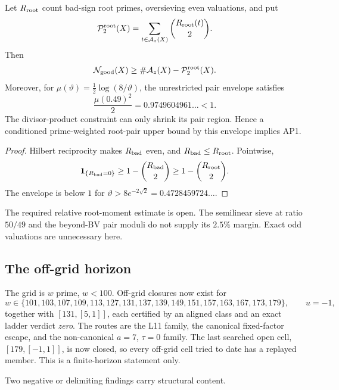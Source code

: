 \begin{proposition}
Let \(R_{\rm root}\) count bad-sign root primes, oversieving even
valuations, and put
\[
\mathcal P_2^{\rm root}(X)=
\sum_{t\in\mathcal A_z(X)}\binom{R_{\rm root}(t)}2.
\]
Then
\[
\mathcal N_{\rm good}(X)
\ge\#\mathcal A_z(X)-\mathcal P_2^{\rm root}(X).
\]
Moreover, for \(\mu(\vartheta)=\frac12\log(8/\vartheta)\), the
unrestricted pair envelope satisfies
\[
\frac{\mu(0.49)^2}{2}=0.9749604961\ldots<1.
\]
The divisor-product constraint can only shrink its pair region.  Hence
a conditioned prime-weighted root-pair upper bound by this envelope
implies AP1.
\end{proposition}

\begin{proof}
Hilbert reciprocity makes \(R_{\rm bad}\) even, and
\(R_{\rm bad}\le R_{\rm root}\).  Pointwise,
\[
\mathbf1_{\{R_{\rm bad}=0\}}
\ge1-\binom{R_{\rm bad}}2
\ge1-\binom{R_{\rm root}}2.
\]
The envelope is below \(1\) for
\(\vartheta>8e^{-2\sqrt2}=0.4728459724\ldots\).
\end{proof}

The required relative root-moment estimate is open.  The semilinear
sieve at ratio \(50/49\) and the beyond-BV pair moduli do not supply
its \(2.5\%\) margin.  Exact odd valuations are unnecessary here.

\subsection{The off-grid horizon}

The grid is $w$ prime, $w<100$.  Off-grid closures now exist for
\[
 w\in\{101,103,107,109,113,127,131,137,139,149,151,157,163,167,173,179\},
 \qquad u=-1,
\]
together with $[131,[5,1]]$, each certified by an aligned class and an exact
ladder verdict \emph{zero}.  The routes are the L11 family, the canonical
fixed-factor escape, and the non-canonical $a=7$, $\tau=0$ family.  The
last searched open cell, $[179,[-1,1]]$, is now closed, so every off-grid
cell tried to date has a replayed member.  This is a finite-horizon
statement only.

Two negative or delimiting findings carry structural content.

